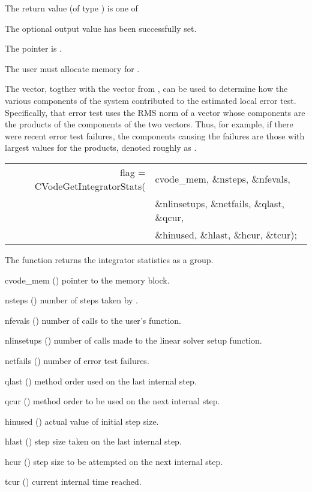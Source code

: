 {
  The return value  (of type ) is one of
  \begin{args}
  \item[\Id{CV\_SUCCESS}] 
    The optional output value has been successfully set.
  \item[\Id{CV\_MEM\_NULL}]
    The  pointer is .
  \end{args}
}
{
  {\warn} The user must allocate memory for .

  The  vector, togther with the  vector from
  , can be used to determine how the various
  components of the system contributed to the estimated local error
  test.  Specifically, that error test uses the RMS norm of a vector
  whose components are the products of the components of the two vectors.
  Thus, for example, if there were recent error test failures, the components
  causing the failures are those with largest values for the products,
  denoted roughly as .
}
{
  \begin{tabular}[t]{@{}r@{}l@{}}
    flag = CVodeGetIntegratorStats(&cvode\_mem, \&nsteps, \&nfevals, \\
                                   &\&nlinsetups, \&netfails, \&qlast, \&qcur, \\
                                   &\&hinused, \&hlast, \&hcur, \&tcur);
  \end{tabular}
}
{
  The function  returns the {\cvode} integrator
  statistics as a group.
}
{
  \begin{args}[nlinsetups]
  \item[cvode\_mem] ()
    pointer to the {\cvode} memory block.
  \item[nsteps] ()
    number of steps taken by {\cvode}.
  \item[nfevals] ()
    number of calls to the user's  function.
  \item[nlinsetups] ()
    number of calls made to the linear solver setup function.
  \item[netfails] ()
    number of error test failures.
  \item[qlast] ()
    method order used on the last internal step.
  \item[qcur] ()
    method order to be used on the next internal step.
  \item[hinused] ()
    actual value of initial step size.
  \item[hlast] ()
    step size taken on the last internal step.
  \item[hcur] ()
    step size to be attempted on the next internal step.
  \item[tcur] ()
    current internal time reached.
  \end{args}
}
